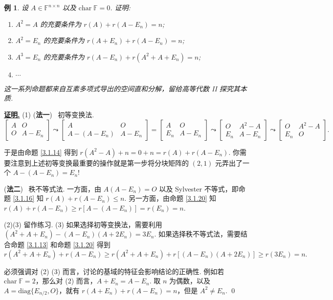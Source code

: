 \documentclass[10pt,openany]{article}
\theoremstyle{thmstyle} %
\theoremstyle{defstyle} %
\theoremstyle{prostyle} %
\theoremstyle{exastyle}
\newtheorem{example}[theorem]{例}
\theoremstyle{remstyle}
\renewenvironment{proof}[1][证明]{\par\underline{\textbf{#1.}} \;\fangsong}{\qed\par}
\newcommand{\F}{\mathbb{F}}
\newcommand{\n}{^{n \times n}}
\newcommand{\tz}{\mathrm{char} \;}
\newcommand{\diag}{\mathrm{diag}}
\begin{document}
\begin{example} \label{3.1.22}
	设 \(  A \in \F\n \) 以及 \( \tz\F=0 \). 证明:
	\begin{enumerate}[(1)]
		\item \( A^2=A \) 的充要条件为 \( r(A)+r(A-E_n)=n \);
		\item \( A^2=E_n \) 的充要条件为 \( r(A+E_n)+r(A-E_n)=n \);
		\item \( A^3=E_n \) 的充要条件为 \( r(A-E_n)+r(A^2+A+E_n)=n \);
		\item \( \cdots \)
	\end{enumerate}
	
	这一系列命题都来自互素多项式导出的空间直和分解，留给高等代数 II 探究其本质.
\end{example}

\begin{proof}
	(1) (\textbf{法一}) \ 初等变换法.
	\[ \begin{bmatrix}
		A & O \\ O & A-E_n 
	\end{bmatrix} \leadsto \begin{bmatrix}
	A & O \\ A-(A-E_n) & A-E_n 
	\end{bmatrix}=\begin{bmatrix}
	A & O \\ E_n & A-E_n 
	\end{bmatrix} \leadsto \begin{bmatrix}
	O & A^2-A \\ E_n & A-E_n 
	\end{bmatrix} \leadsto \begin{bmatrix}
	O & A^2-A \\ E_n & O 
	\end{bmatrix}. \]
	
	于是由命题 \ref{3.1.14} 得到 \( r(A^2-A)+n=0+n=r(A)+r(A-E_n) \). 你需要注意到上述初等变换最重要的操作就是第一步将分块矩阵的 \( (2,1)\) 元弄出了一个 \( A-(A-E_n)=E_n \)!
	
	\vspace{1ex}
	
	(\textbf{法二}) \ 秩不等式法. 一方面，由 \( A(A-E_n)=O \) 以及 Sylvester 不等式，即命题 \ref{3.1.16} 知 \( r(A)+r(A-E_n) \leq n \). 另一方面，由命题 \ref{3.1.20} 知 \( r(A)+r(A-E_n) \geq r[A-(A-E_n)]=r(E_n)=n \).
	
	\vspace{1ex}
	
	(2)(3) 留作练习. (3) 如果选择初等变换法，需要利用 \( (A^2+A+E_n)-(A-E_n)(A+2E_n)=3E_n \). 如果选择秩不等式法，需要结合命题 \ref{3.1.13} 和命题 \ref{3.1.20} 得到
	\[ r(A^2+A+E_n)+r(A-E_n) \geq r(A^2+A+E_n)+r[(A-E_n)(A+2E_n)] \geq r(3E_n)=n. \]
	
	必须强调对 (2) (3) 而言，讨论的基域的特征会影响结论的正确性. 例如若 \( \tz \F=2 \)，那么对 (2) 而言，\( A+E_n=A-E_n \). 取 \( n \) 为偶数，以及 \( A=\diag\{E_{n/2},O\} \)，就有 \( r(A+E_n)+r(A-E_n)=n \)，但是 \( A^2 \neq E_n \).
\end{proof}
\end{document}
